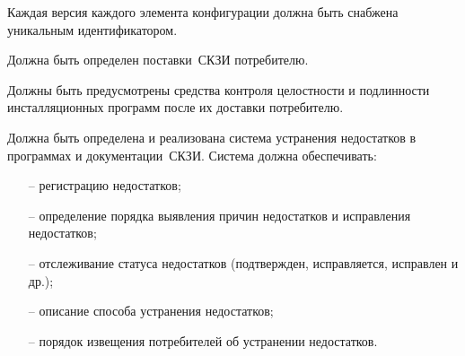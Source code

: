 \label{R.LC.CMVersion}
Каждая версия каждого элемента конфигурации 
должна быть снабжена уникальным идентификатором. 

\label{R.LC.Delivery}
Должна быть определен  поставки~СКЗИ потребителю.  

\label{R.LC.Authenticode}
Должны быть предусмотрены средства контроля целостности и подлинности 
инсталляционных программ после их доставки потребителю. 

\label{R.LC.FlawRemediation}
Должна быть определена и реализована система устранения недостатков в программах
и документации~СКЗИ.
%
Система должна обеспечивать:
\begin{itemize}
\item[--]
регистрацию недостатков;
\item[--]
определение порядка выявления причин недостатков
и исправления недостатков;
\item[--]
отслеживание статуса недостатков 
(подтвержден, исправляется, исправлен и др.);
\item[--]
описание способа устранения недостатков;
\item[--]
порядок извещения потребителей об устранении недостатков.
\end{itemize}
